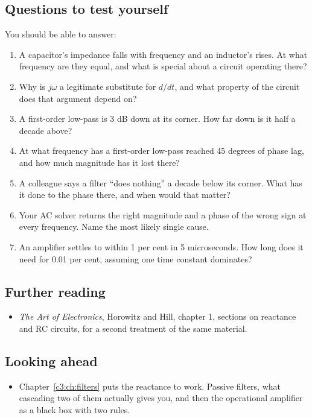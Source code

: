 \subsection*{Questions to test yourself}
You should be able to answer:
\begin{enumerate}
  \item A capacitor's impedance falls with frequency and an inductor's rises. At what frequency are they equal, and what is special about a circuit operating there?
  \item Why is $j\omega$ a legitimate substitute for $d/dt$, and what property of the circuit does that argument depend on?
  \item A first-order low-pass is 3 dB down at its corner. How far down is it half a decade above?
  \item At what frequency has a first-order low-pass reached 45 degrees of phase lag, and how much magnitude has it lost there?
  \item A colleague says a filter ``does nothing'' a decade below its corner. What has it done to the phase there, and when would that matter?
  \item Your AC solver returns the right magnitude and a phase of the wrong sign at every frequency. Name the most likely single cause.
  \item An amplifier settles to within 1 per cent in 5 microseconds. How long does it need for 0.01 per cent, assuming one time constant dominates?
\end{enumerate}

\subsection*{Further reading}
\begin{itemize}
  \item \emph{The Art of Electronics}, Horowitz and Hill, chapter 1, sections on reactance and RC circuits, for a second treatment of the same material.
\end{itemize}

\subsection*{Looking ahead}
\begin{itemize}
  \item Chapter~\ref{c3:ch:filters} puts the reactance to work. Passive filters, what cascading two of them actually gives you, and then the operational amplifier as a black box with two rules.
\end{itemize}

